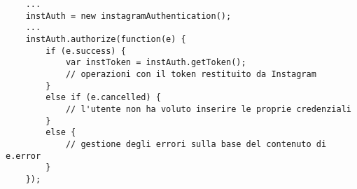 \begin{lstlisting}
	...
	instAuth = new instagramAuthentication();
	...
	instAuth.authorize(function(e) {
		if (e.success) {
			var instToken = instAuth.getToken();
			// operazioni con il token restituito da Instagram
		}
		else if (e.cancelled) {
			// l'utente non ha voluto inserire le proprie credenziali
		}
		else {
			// gestione degli errori sulla base del contenuto di e.error
		}
	});
\end{lstlisting}
